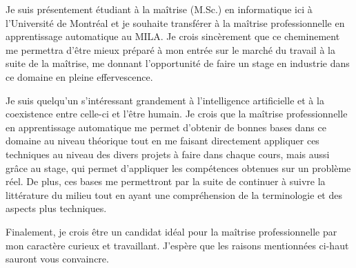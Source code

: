 \documentclass[11pt, a4paper]{awesome-cv}
\begin{document}
\makecvheader

\makelettertitle

\begin{cvletter}

Je suis présentement étudiant à la maîtrise (M.Sc.) en informatique ici à l'Université de Montréal et je souhaite transférer à la maîtrise professionnelle en apprentissage automatique au MILA. Je crois sincèrement que ce cheminement me permettra d'être mieux préparé à mon entrée sur le marché du travail à la suite de la maîtrise, me donnant l'opportunité de faire un stage en industrie dans ce domaine en pleine effervescence. 

Je suis quelqu'un s'intéressant grandement à l'intelligence artificielle et à la coexistence entre celle-ci et l'être humain. Je crois que la maîtrise professionnelle en apprentissage automatique me permet d'obtenir de bonnes bases dans ce domaine au niveau théorique tout en me faisant directement appliquer ces techniques au niveau des divers projets à faire dans chaque cours, mais aussi grâce au stage, qui permet d'appliquer les compétences obtenues sur un problème réel. De plus, ces bases me permettront par la suite de continuer à suivre la littérature du milieu tout en ayant une compréhension de la terminologie et des aspects plus techniques. 

Finalement, je crois être un candidat idéal pour la maîtrise professionnelle par mon caractère curieux et travaillant. J'espère que les raisons mentionnées ci-haut sauront vous convaincre.

\end{cvletter}

\makeletterclosing
\end{document}
